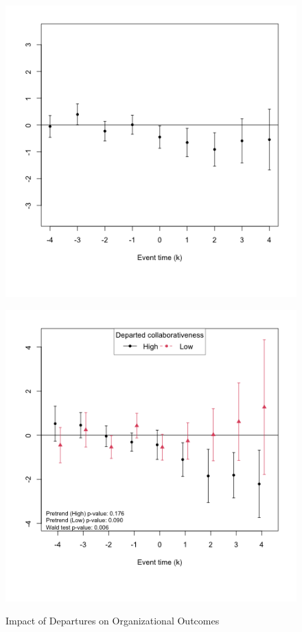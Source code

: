 \begin{figure}[htbp]
    \caption{Impact of Departures on Organizational Outcomes}
    \label{fig:prs_opened}
    \centering
    \begin{minipage}[b]{0.49\textwidth}
        \centering
         \label{fig:all_prs_opened}
        \includegraphics[width=\textwidth]{temp/output/prs_opened_norm.png}
    \end{minipage}
    \hfill
    \begin{minipage}[b]{0.49\textwidth}
        \centering
        \label{fig:all_prs_opened_collab}
        \includegraphics[width=\textwidth]{temp/output/collab/prs_opened_collab_cs_norm.png}

\end{minipage}
\end{figure}
